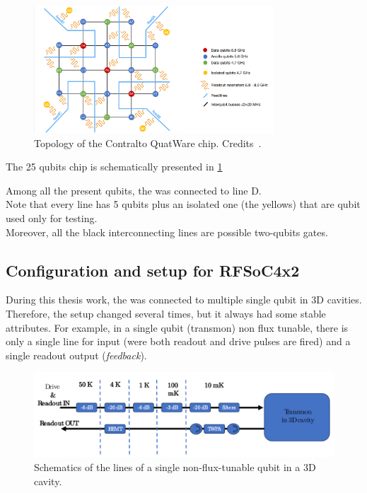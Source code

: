 \begin{figure}[ht]
    \centering
    \includegraphics[width=0.8\textwidth]{Setup-software/figures/contralto.png}
    \caption[Topology of the Contralto QuatWare chip]{Topology of the Contralto QuatWare chip. Credits~\cite{contralto}.}
    \label{fig:contraltro_chip}
\end{figure}
The 25 qubits chip is schematically presented in \cref{fig:contraltro_chip}

Among all the present qubits, the \ZCU was connected to line D.\\
Note that every line has 5 qubits plus an isolated one (the yellows) that are qubit used only for testing.\\
Moreover, all the black interconnecting lines are possible two-qubits gates.


\subsection{Configuration and setup for RFSoC4x2}

During this thesis work, the \RFSoC was connected to multiple single qubit in 3D cavities.
Therefore, the setup changed several times, but it always had some stable attributes.
For example, in a single qubit (transmon) non flux tunable, there is only a single line for input (were both readout and drive pulses are fired) and a single readout output (\textit{feedback}).

\begin{figure}[ht]
    \centering
    \includegraphics[width=\textwidth]{Setup-software/figures/scheme_lines_single.pdf}
    \caption{Schematics of the lines of a single non-flux-tunable qubit in a 3D cavity.}
    \label{fig:lines_single}
\end{figure}

